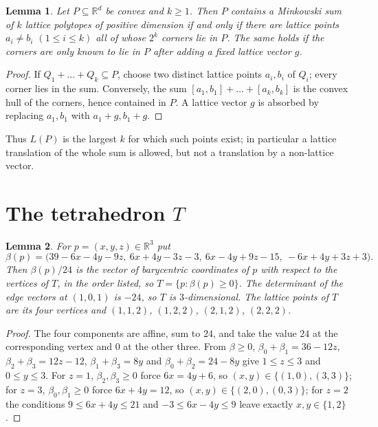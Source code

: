 \documentclass[11pt]{article}
\newtheorem{lemma}{Lemma}
\theoremstyle{definition}
\theoremstyle{remark}
\newcommand{\R}{\mathbb R}
\begin{document}
\begin{lemma}\label{lem:corners}
Let $P\subseteq\R^d$ be convex and $k\ge1$. Then $P$ contains a Minkowski sum
of $k$ lattice polytopes of positive dimension if and only if there are lattice
points $a_i\ne b_i$ $(1\le i\le k)$ all of whose $2^k$ corners lie in $P$.
The same holds if the corners are only known to lie in $P$ after adding a fixed
lattice vector $g$.
\end{lemma}

\begin{proof}
If $Q_1+\dots+Q_k\subseteq P$, choose two distinct lattice points $a_i,b_i$ of
$Q_i$; every corner lies in the sum. Conversely, the sum
$[a_1,b_1]+\dots+[a_k,b_k]$ is the convex hull of the corners, hence contained
in $P$. A lattice vector $g$ is absorbed by replacing $a_1,b_1$ with
$a_1+g,b_1+g$.
\end{proof}

Thus $L(P)$ is the largest $k$ for which such points exist; in particular a
lattice translation of the whole sum is allowed, but not a translation by a
non-lattice vector.

\section{The tetrahedron \texorpdfstring{$T$}{T}}\label{sec:T}

\begin{lemma}\label{lem:Tpoints}
For $p=(x,y,z)\in\R^3$ put
\[
\beta(p)=\bigl(39-6x-4y-9z,\ 6x+4y-3z-3,\ 6x-4y+9z-15,\ -6x+4y+3z+3\bigr).
\]
Then $\beta(p)/24$ is the vector of barycentric coordinates of $p$ with respect
to the vertices of $T$, in the order listed, so $T=\{p:\beta(p)\ge0\}$. The
determinant of the edge vectors at $(1,0,1)$ is $-24$, so $T$ is
$3$-dimensional. The lattice points of $T$ are its four vertices and
$(1,1,2)$, $(1,2,2)$, $(2,1,2)$, $(2,2,2)$.
\end{lemma}

\begin{proof}
The four components are affine, sum to $24$, and take the value $24$ at the
corresponding vertex and $0$ at the other three. From $\beta\ge0$,
$\beta_0+\beta_1=36-12z$, $\beta_2+\beta_3=12z-12$, $\beta_1+\beta_3=8y$ and
$\beta_0+\beta_2=24-8y$ give $1\le z\le3$ and $0\le y\le3$. For $z=1$,
$\beta_2,\beta_3\ge0$ force $6x=4y+6$, so $(x,y)\in\{(1,0),(3,3)\}$; for $z=3$,
$\beta_0,\beta_1\ge0$ force $6x+4y=12$, so $(x,y)\in\{(2,0),(0,3)\}$; for $z=2$
the conditions $9\le6x+4y\le21$ and $-3\le6x-4y\le9$ leave exactly
$x,y\in\{1,2\}$.
\end{proof}
\end{document}
